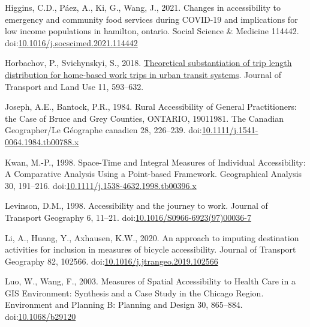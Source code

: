 \documentclass[]{elsarticle} %
\newlength{\cslhangindent}
\newlength{\cslentryspacingunit} %
\newenvironment{CSLReferences}[2] %
 {%
  \setlength{\parindent}{0pt}
  \ifodd #1
  \let\oldpar\par
  \def\par{\hangindent=\cslhangindent\oldpar}
  \fi
  \setlength{\parskip}{#2\cslentryspacingunit}
 }%
 {}
\begin{document}
\begin{CSLReferences}{1}{0}
\leavevmode{}%
Higgins, C.D., Páez, A., Ki, G., Wang, J., 2021. Changes in
accessibility to emergency and community food services during COVID-19
and implications for low income populations in hamilton, ontario. Social
Science \& Medicine 114442.
doi:\href{https://doi.org/10.1016/j.socscimed.2021.114442}{10.1016/j.socscimed.2021.114442}

\leavevmode{}%
Horbachov, P., Svichynskyi, S., 2018.
\href{https://www.jstor.org/stable/26622420}{Theoretical substantiation
of trip length distribution for home-based work trips in urban transit
systems}. Journal of Transport and Land Use 11, 593--632.

\leavevmode{}%
Joseph, A.E., Bantock, P.R., 1984. Rural Accessibility of General
Practitioners: the Case of Bruce and Grey Counties, ONTARIO,
1901{\textendash}1981. The Canadian Geographer/Le Géographe canadien 28,
226--239.
doi:\href{https://doi.org/10.1111/j.1541-0064.1984.tb00788.x}{10.1111/j.1541-0064.1984.tb00788.x}

\leavevmode{}%
Kwan, M.-P., 1998. Space-{Time} and {Integral} {Measures} of
{Individual} {Accessibility}: {A} {Comparative} {Analysis} {Using} a
{Point}-based {Framework}. Geographical Analysis 30, 191--216.
doi:\href{https://doi.org/10.1111/j.1538-4632.1998.tb00396.x}{10.1111/j.1538-4632.1998.tb00396.x}

\leavevmode{}%
Levinson, D.M., 1998. Accessibility and the journey to work. Journal of
Transport Geography 6, 11--21.
doi:\href{https://doi.org/10.1016/S0966-6923(97)00036-7}{10.1016/S0966-6923(97)00036-7}

\leavevmode{}%
Li, A., Huang, Y., Axhausen, K.W., 2020. An approach to imputing
destination activities for inclusion in measures of bicycle
accessibility. Journal of Transport Geography 82, 102566.
doi:\href{https://doi.org/10.1016/j.jtrangeo.2019.102566}{10.1016/j.jtrangeo.2019.102566}

\leavevmode{}%
Luo, W., Wang, F., 2003. Measures of Spatial Accessibility to Health
Care in a GIS Environment: Synthesis and a Case Study in the Chicago
Region. Environment and Planning B: Planning and Design 30, 865--884.
doi:\href{https://doi.org/10.1068/b29120}{10.1068/b29120}


\end{CSLReferences}
\end{document}
